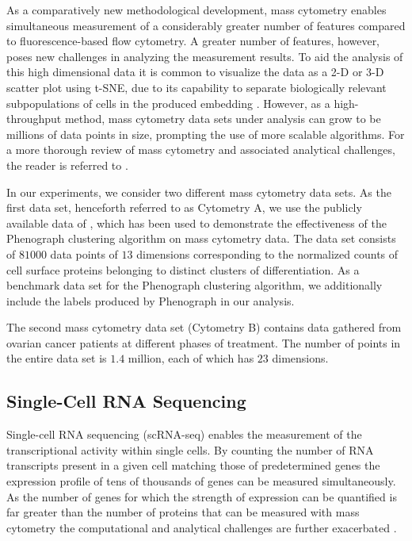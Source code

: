 As a comparatively new methodological development, mass cytometry enables simultaneous measurement of a considerably greater number of features compared to fluorescence-based flow cytometry. A greater number of features, however, poses new challenges in analyzing the measurement results. To aid the analysis of this high dimensional data it is common to visualize the data as a 2-D or 3-D scatter plot using t-SNE, due to its capability to separate biologically relevant subpopulations of cells in the produced embedding \cite{visne}. However, as a high-throughput method, mass cytometry data sets under analysis can grow to be millions of data points in size, prompting the use of more scalable algorithms. For a more thorough review of mass cytometry and associated analytical challenges, the reader is referred to \cite{mass_cytometry}.

In our experiments, we consider two different mass cytometry data sets. As the first data set, henceforth referred to as Cytometry A, we use the publicly available data of \cite{phenograph}, which has been used to demonstrate the effectiveness of the Phenograph clustering algorithm on mass cytometry data. The data set consists of $81000$ data points of $13$ dimensions corresponding to the normalized counts of cell surface proteins belonging to distinct clusters of differentiation. As a benchmark data set for the Phenograph clustering algorithm, we additionally include the labels produced by Phenograph in our analysis.

The second mass cytometry data set (Cytometry B) contains data gathered from ovarian cancer patients at different phases of treatment. The number of points in the entire data set is $1.4$ million, each of which has $23$ dimensions.

\subsection{Single-Cell RNA Sequencing}

Single-cell RNA sequencing (scRNA-seq) enables the measurement of the transcriptional activity within single cells. By counting the number of RNA transcripts present in a given cell matching those of predetermined genes the expression profile of tens of thousands of genes can be measured simultaneously. As the number of genes for which the strength of expression can be quantified is far greater than the number of proteins that can be measured with mass cytometry the computational and analytical challenges are further exacerbated \cite{high_dimensional_data_spaces_gene_and_protein, computational_challenges_single_cell_transcriptomics}.

